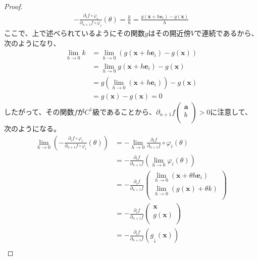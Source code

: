\documentclass[dvipdfmx]{jsarticle}
\begin{document}
\begin{proof}
\begin{align*}
- \frac{\partial_{i}f \circ \varphi_{i}}{\partial_{n + 1}f \circ \varphi_{i}}(\theta) = \frac{k}{h} = \frac{g\left( \mathbf{x} + h\mathbf{e}_{i} \right) - g\left( \mathbf{x} \right)}{h}
\end{align*}
ここで、上で述べられているようにその関数$g$はその開近傍$V$で連続であるから、次のようになり、
\begin{align*}
\lim_{h \rightarrow 0}k &= \lim_{h \rightarrow 0}\left( g\left( \mathbf{x} + h\mathbf{e}_{i} \right) - g\left( \mathbf{x} \right) \right)\\
&= \lim_{h \rightarrow 0}{g\left( \mathbf{x} + h\mathbf{e}_{i} \right)} - g\left( \mathbf{x} \right)\\
&= g\left( \lim_{h \rightarrow 0}\left( \mathbf{x} + h\mathbf{e}_{i} \right) \right) - g\left( \mathbf{x} \right)\\
&= g\left( \mathbf{x} \right) - g\left( \mathbf{x} \right) = 0
\end{align*}
したがって、その関数$f$が$C^{1}$級であることから、$\partial_{n + 1}f\begin{pmatrix}
\mathbf{a} \\
b \\
\end{pmatrix} > 0$に注意して、次のようになる。
\begin{align*}
\lim_{h \rightarrow 0}\left( - \frac{\partial_{i}f \circ \varphi_{i}}{\partial_{n + 1}f \circ \varphi_{i}}(\theta) \right) &= - \lim_{h \rightarrow 0}{\frac{\partial_{i}f}{\partial_{n + 1}f} \circ \varphi_{i}(\theta)}\\
&= - \frac{\partial_{i}f}{\partial_{n + 1}f}\left( \lim_{h \rightarrow 0}{\varphi_{i}(\theta)} \right)\\
&= - \frac{\partial_{i}f}{\partial_{n + 1}f}\begin{pmatrix}
\lim_{h \rightarrow 0}\left( \mathbf{x} + \theta h\mathbf{e}_{i} \right) \\
\lim_{h \rightarrow 0}\left( g\left( \mathbf{x} \right) + \theta k \right) \\
\end{pmatrix}\\
&= - \frac{\partial_{i}f}{\partial_{n + 1}f}\begin{pmatrix}
\mathbf{x} \\
g\left( \mathbf{x} \right) \\
\end{pmatrix}\\
&= - \frac{\partial_{i}f}{\partial_{n + 1}f}\left( g_{\downarrow}\left( \mathbf{x} \right) \right)\\

\end{align*}
\end{proof}
\end{document}
